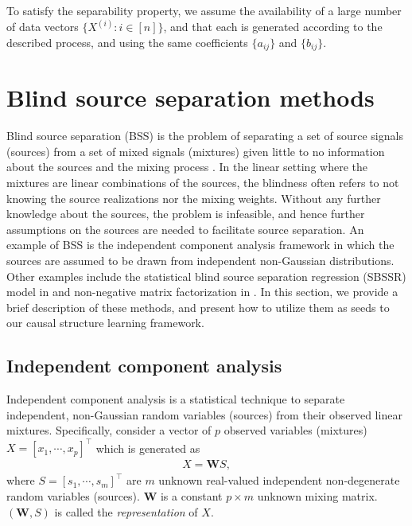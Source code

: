 \documentclass[12pt]{article}
\newcommand{\bW}{\mathbf{W}}
\begin{document}
To satisfy the separability property, we assume the availability of a large number of data vectors $\{X^{(i)}: i\in[n]\}$, and that each is generated according to the described process, and using the same coefficients $\{a_{ij}\}$ and $\{b_{ij}\}$.


\section{Blind source separation methods} \label{app:BSS}
Blind source separation (BSS) is the problem of separating a set of source signals (sources) from a set of mixed signals (mixtures) given little to no information about the sources and the mixing process \citep{comon2010handbook}. In the linear setting where the mixtures are linear combinations of the sources, the blindness often refers to not knowing the source realizations nor the mixing weights. Without any further knowledge about the sources, the problem is infeasible, and hence further assumptions on the sources are needed to facilitate source separation. An example of BSS is the independent component analysis framework in which the sources are assumed to be drawn from independent non-Gaussian distributions. Other examples include the statistical blind source separation regression (SBSSR) model in \citep{behr2018multiscale} and non-negative matrix factorization in \citep{donoho2004does}. In this section, we provide a brief description of these methods, and present how to utilize them as seeds to our causal structure learning framework.     

\subsection{Independent component analysis}\label{Sec:ICA}
Independent component analysis \citep{comon1994independent} is a statistical technique to separate independent, non-Gaussian random variables (sources) from their observed linear mixtures. Specifically, consider a vector of $p$ observed variables (mixtures) $X=[x_1,\cdots, x_p]^{\top}$ which is generated as
\begin{align}
X = \bW S,
\label{eq:ICA}
\end{align}
where $S=[s_1,\cdots,s_m]^{\top}$ are $m$ unknown real-valued independent non-degenerate random variables (sources). $\bW$ is a constant $p\times m$ unknown mixing matrix. $(\bW,S)$ is called the {\it{representation}} of $X$.
\end{document}
